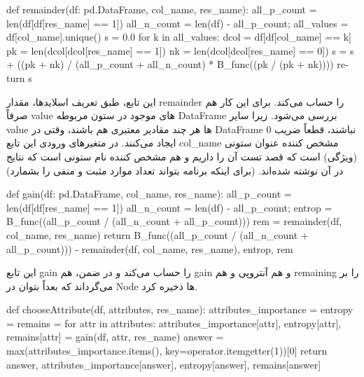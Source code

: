 \documentclass[12pt,titlepage,a4page , tikz , multi,table , svgnames,xcdraw]{article}
\begin{document}
\begin{latin}
\begin{python}
def remainder(df: pd.DataFrame, col_name, res_name):
    all_p_count = len(df[df[res_name] == 1])
    all_n_count = len(df) - all_p_count;
    all_values = df[col_name].unique()
    s = 0.0
    for k in all_values:
        dcol = df[df[col_name] == k]
        pk = len(dcol[dcol[res_name] == 1])
        nk = len(dcol[dcol[res_name] == 0])
        s = s + ((pk + nk) / (all_p_count + all_n_count)
         * B_func((pk / (pk + nk))))
    return s
\end{python}

\end{latin}

این تابع، طبق تعریف اسلایدها، مقدار remainder را حساب می‌کند. برای این کار هم صرفاً value های موجود در ستون مربوطه DataFrame بررسی می‌شود. زیرا سایر value ها هر چند مقادیر معتبری هم باشند، وقتی در DataFrame نباشند، قطعاً ضریب 0 ایجاد می‌کنند. در متغیرهای ورودی این تابع col\_name مشخص کننده عنوان ستونی (ویژگی) است که قصد تست آن را داریم و  هم مشخص کننده نام ستونی است که نتایج در آن نوشته شده‌اند. (برای اینکه برنامه بتواند تعداد موارد مثبت و منفی را بشمارد)

\newpage

\begin{latin}
\begin{python}[language=Python]
def gain(df: pd.DataFrame, col_name, res_name):
    all_p_count = len(df[df[res_name] == 1])
    all_n_count = len(df) - all_p_count;
    entrop = B_func((all_p_count / (all_n_count + all_p_count)))
    rem = remainder(df, col_name, res_name)
    return B_func((all_p_count / (all_n_count + all_p_count)))
     - remainder(df, col_name, res_name), entrop, rem

\end{python}

\end{latin}

این تابع gain را حساب می‌کند و در ضمن، هم gain و هم آنتروپی و هم remaining را بر می‌گرداند که بعداً بتوان در Node ها ذخیره کرد.


\begin{latin}
\begin{python}[language=Python]
def chooseAttribute(df, attributes, res_name):
    attributes_importance = {}
    entropy = {}
    remains = {}
    for attr in attributes:
        attributes_importance[attr], entropy[attr],
         remains[attr] = gain(df, attr, res_name)
    answer = max(attributes_importance.items(),
     key=operator.itemgetter(1))[0]
    return answer, attributes_importance[answer],
     entropy[answer], remains[answer]

\end{python}

\end{latin}
\end{document}
